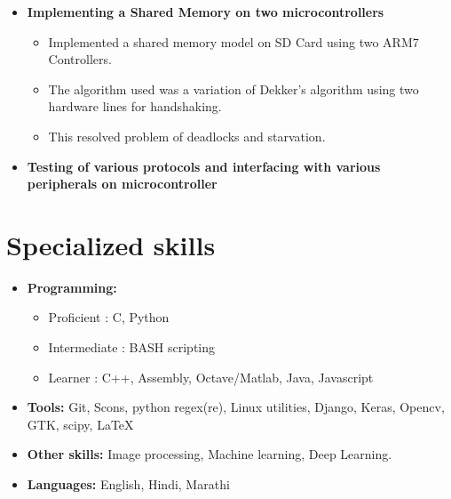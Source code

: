 \documentclass[10pt,a4paper,sans]{moderncv}        %
\begin{document}
\begin{itemize}
	
\item{\textbf{Implementing a Shared Memory on two microcontrollers}

\vspace{3pt}

		\small{
			\begin{itemize}
					\item Implemented a shared memory model on SD Card using two ARM7 Controllers.
					\item The algorithm used was a variation of Dekker's algorithm using two hardware lines for handshaking.
					\item This resolved problem of deadlocks and starvation.
			\end{itemize}
			}}

	\vspace{6pt}
	\item{\textbf{Testing of various protocols and interfacing with various peripherals on microcontroller}}

\end{itemize}

\section{Specialized skills}

\vspace{5pt}

\begin{itemize}

\item \textbf{Programming:} 
	\begin{itemize}
			\item Proficient : C, Python
			\item Intermediate : BASH scripting
			\item Learner : C++, Assembly, Octave/Matlab, Java, Javascript
	\end{itemize}

\vspace{3pt}

\item \textbf{Tools:} Git, Scons, python regex(re), Linux utilities, Django, Keras, Opencv, GTK, scipy, \LaTeX

\vspace{3pt}

\item \textbf{Other skills:}  Image processing, Machine learning, Deep Learning.

\vspace{3pt}

\item \textbf{Languages:} English, Hindi, Marathi

\end{itemize}
\end{document}
